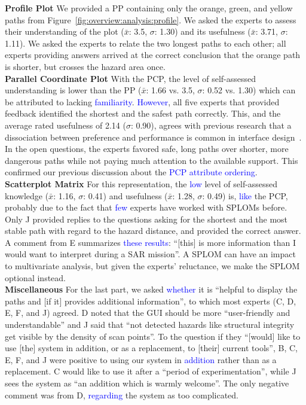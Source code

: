 \documentclass{egpubl}
\newcommand{\diff}[1]{\textcolor{blue}{#1}}
\begin{document}
%
\textbf{Profile Plot} We provided a PP containing only the orange, green, and yellow paths from Figure~\ref{fig:overview:analysis:profile}. We asked the experts to assess their understanding of the plot ($\bar{x}$: 3.5, $\sigma$: 1.30) and its usefulness ($\bar{x}$: 3.71, $\sigma$: 1.11). We asked the experts to relate the two longest paths to each other; all experts providing answers arrived at the correct conclusion that the orange path is shorter, but crosses the hazard area once. \\
%
\textbf{Parallel Coordinate Plot} With the PCP, the level of self-assessed understanding is lower than the PP ($\bar{x}$: 1.66 vs. 3.5, $\sigma$: 0.52 vs. 1.30) which can be attributed to lacking \diff{familiarity}. \diff{However}, all five experts that provided feedback identified the shortest and the safest path correctly. This, and the average rated usefulness of 2.14 ($\sigma$: 0.90), agrees with previous research that a dissociation between preference and performance is common in interface design~\cite{andre1995users}. In the open questions, the experts favored safe, long paths over shorter, more dangerous paths while not paying much attention to the available support. This confirmed our previous discussion about the \diff{PCP attribute ordering}.\\
%
\textbf{Scatterplot Matrix} For this representation, the \diff{low} level of self-assessed knowledge ($\bar{x}$: 1.16, $\sigma$: 0.41) and usefulness ($\bar{x}$: 1.28, $\sigma$: 0.49) is, \diff{like} the PCP, probably due to the fact that \diff{few} experts have worked with SPLOMs before. Only J provided replies to the questions asking for the shortest and the most stable path with regard to the hazard distance, and provided the correct answer. A comment from E summarizes \diff{these results}: ``[this] is more information than I would want to interpret during a SAR mission''. A SPLOM can have an impact to multivariate analysis, but given the experts' reluctance, we make the SPLOM optional instead.\\
%
\noindent \textbf{Miscellaneous} For the last part, we asked \diff{whether} it is ``helpful to display the paths and [if it] provides additional information'', to which most experts (C, D, E, F, and J) agreed. D noted that the GUI should be more ``user-friendly and understandable'' and J said that ``not detected hazards like structural integrity get visible by the density of scan points''. To the question if they ``[would] like to use [the] system in addition, or as a replacement, to [their] current tools'', B, C, E, F, and J were positive to using our system in \diff{addition} rather than as a replacement. C would like to use it after a ``period of experimentation'', while J sees the system as ``an addition which is warmly welcome''. The only negative comment was from D, \diff{regarding} the system as too complicated. %
\end{document}
